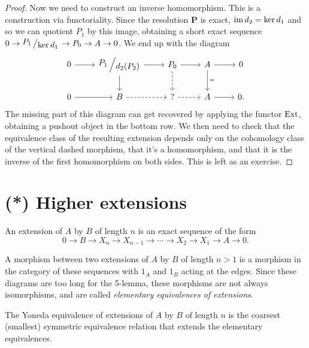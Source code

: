 \begin{proof}
    Now we need to construct an inverse homomorphism. This is a construction via functoriality. Since the resolution $\bm{P}$ is exact, $\operatorname{im} d_2=\ker d_1$ and so we can quotient $P_1$ by this image, obtaining a short exact sequence $0\to \bigslant{P_1}{\ker d_1} \to P_0\to A\to 0$. We end up with the diagram
    \[\begin{tikzcd}
        0\arrow[r] & \bigslant{P_1}{d_2(P_2)}\arrow[r]\arrow[d] & P_0 \arrow[r]\arrow[d,dashed] & A\arrow[r]\arrow[d,"="] & 0 \\
        0\arrow[r] & B\arrow[r,dashed] & ? \arrow[r,dashed] & A\arrow[r] & 0.
    \end{tikzcd}\]
    The missing part of this diagram can get recovered by applying the functor $\operatorname{Ext}$, obtaining a pushout object in the bottom row. We then need to check that the equivalence class of the resulting extension depends only on the cohomology class of the vertical dashed morphism, that it's a homomorphism, and that it is the inverse of the first homomorphism on both sides. This is left as an exercise.
\end{proof}




\section{(*) Higher extensions}

\begin{defn}
    An extension of $A$ by $B$ of length $n$ is an exact sequence of the form
    \[0\to B\to X_n\to X_{n-1}\to \cdots \to X_2\to X_1\to A\to 0.\]

    A morphism between two extensions of $A$ by $B$ of length $n>1$ is a morphism in the category of these sequences with $1_A$ and $1_B$ acting at the edges. Since these diagrams are too long for the 5-lemma, these morphisms are not always isomorphisms, and are called \emph{elementary equivalences of extensions}.
\end{defn}


\begin{defn}
    The Yoneda equivalence of extensions of $A$ by $B$ of length $n$ is the coarsest (smallest) symmetric equivalence relation that extends the elementary equivalences.
\end{defn}

